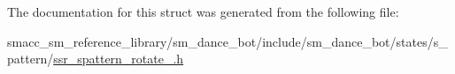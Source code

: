 The documentation for this struct was generated from the following file\+:\begin{DoxyCompactItemize}
\item 
smacc\+\_\+sm\+\_\+reference\+\_\+library/sm\+\_\+dance\+\_\+bot/include/sm\+\_\+dance\+\_\+bot/states/s\+\_\+pattern/\hyperlink{ssr__spattern__rotate__3_8h}{ssr\+\_\+spattern\+\_\+rotate\+\_.\+h}\end{DoxyCompactItemize}
